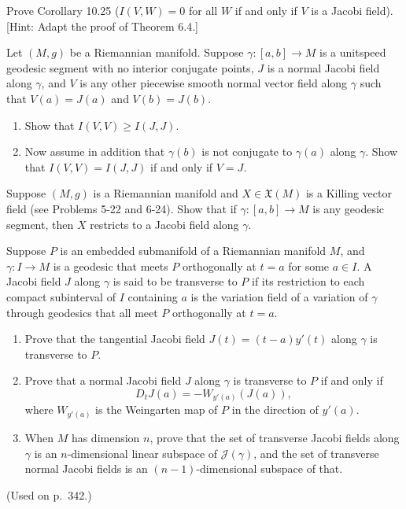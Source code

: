\begin{exercise}\label{prob:jacobi-field-index-form}
Prove Corollary 10.25 ($I(V, W) = 0$ for all $W$ if and only if $V$ is a Jacobi field). [Hint: Adapt the proof of Theorem 6.4.]
\end{exercise}

\begin{exercise}\label{prob:normal-jacobi-minimizes-index}
Let $(M, g)$ be a Riemannian manifold. Suppose $\gamma: [a, b] \to M$ is a unitspeed geodesic segment with no interior conjugate points, $J$ is a normal Jacobi field along $\gamma$, and $V$ is any other piecewise smooth normal vector field along $\gamma$ such that $V(a) = J(a)$ and $V(b) = J(b)$.
\begin{enumerate}
\item[(a)] Show that $I(V, V) \geq I(J, J)$.
\item[(b)] Now assume in addition that $\gamma(b)$ is not conjugate to $\gamma(a)$ along $\gamma$. Show that $I(V, V) = I(J, J)$ if and only if $V = J$.
\end{enumerate}
\end{exercise}

\begin{exercise}\label{prob:killing-vector-jacobi-field}
Suppose $(M, g)$ is a Riemannian manifold and $X \in \mathfrak{X}(M)$ is a Killing vector field (see Problems 5-22 and 6-24). Show that if $\gamma: [a, b] \to M$ is any geodesic segment, then $X$ restricts to a Jacobi field along $\gamma$.
\end{exercise}

\begin{exercise}\label{prob:transverse-jacobi-field}
Suppose $P$ is an embedded submanifold of a Riemannian manifold $M$, and $\gamma: I \to M$ is a geodesic that meets $P$ orthogonally at $t = a$ for some $a \in I$. A Jacobi field $J$ along $\gamma$ is said to be transverse to $P$ if its restriction to each compact subinterval of $I$ containing $a$ is the variation field of a variation of $\gamma$ through geodesics that all meet $P$ orthogonally at $t = a$.
\begin{enumerate}
\item[(a)] Prove that the tangential Jacobi field $J(t) = (t - a)y'(t)$ along $\gamma$ is transverse to $P$.
\item[(b)] Prove that a normal Jacobi field $J$ along $\gamma$ is transverse to $P$ if and only if
\[
D_t J(a) = -W_{y'(a)}(J(a)),
\]
where $W_{y'(a)}$ is the Weingarten map of $P$ in the direction of $y'(a)$.
\item[(c)] When $M$ has dimension $n$, prove that the set of transverse Jacobi fields along $\gamma$ is an $n$-dimensional linear subspace of $\mathcal{J}(\gamma)$, and the set of transverse normal Jacobi fields is an $(n-1)$-dimensional subspace of that.
\end{enumerate}

(Used on p.\ 342.)
\end{exercise}

